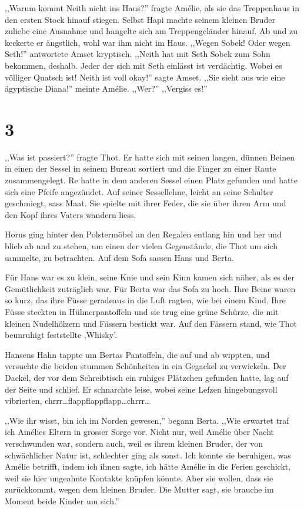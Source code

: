 \documentclass[11pt,titlepage,a5paper]{book}
\begin{document}
,,Warum kommt Neith nicht ins Haus?'' fragte Amélie, als sie das Treppenhaus in den ersten Stock hinauf stiegen. Selbst Hapi machte seinem kleinen Bruder zuliebe eine Ausnahme und hangelte sich am Treppengeländer hinauf. Ab und zu keckerte er ängstlich, wohl war ihm nicht im Haus. ,,Wegen Sobek! Oder wegen Seth!'' antwortete Amset kryptisch. ,,Neith hat mit Seth Sobek zum Sohn bekommen, deshalb. Jeder der sich mit Seth einlässt ist verdächtig. Wobei es völliger Quatsch ist! Neith ist voll okay!'' sagte Amset. ,,Sie sieht aus wie eine ägyptische Diana!'' meinte Amélie. ,,Wer?'' ,,Vergiss es!''

\section*{3}

,,Was ist passiert?'' fragte Thot. Er hatte sich mit seinen langen, dünnen Beinen in einen der Sessel in seinem Bureau sortiert und die Finger zu einer Raute zusammengelegt. Re hatte in dem anderen Sessel einen Platz gefunden und hatte sich eine Pfeife angezündet. Auf seiner Sessellehne, leicht an seine Schulter geschmiegt, sass Maat. Sie spielte mit ihrer Feder, die sie über ihren Arm und den Kopf ihres Vaters wandern liess. 

Horus ging hinter den Polstermöbel an den Regalen entlang hin und her und blieb ab und zu stehen, um einen der vielen Gegenstände, die Thot um sich sammelte, zu betrachten. Auf dem Sofa sassen Hans und Berta.

Für Hans war es zu klein, seine Knie und sein Kinn kamen sich näher, als es der Gemütlichkeit zuträglich war. Für Berta war das Sofa zu hoch. Ihre Beine waren so kurz, das ihre Füsse geradeaus in die Luft ragten, wie bei einem Kind. Ihre Füsse steckten in  Hühnerpantoffeln und sie trug eine grüne Schürze, die mit kleinen Nudelhölzern und Fässern bestickt war. Auf den Fässern stand, wie Thot beunruhigt feststellte ,Whisky'.

 Hansens Hahn tappte um Bertas Pantoffeln, die auf und ab wippten, und versuchte die beiden stummen Schönheiten in ein Gegackel zu verwickeln. Der Dackel, der vor dem Schreibtisch ein ruhiges Plätzchen gefunden hatte, lag auf der Seite und schlief. Er schnarchte leise, wobei seine Lefzen hingebungsvoll vibrierten, chrrr\dots flappflappflapp\dots chrrr\dots
 
,,Wie ihr wisst, bin ich im Norden gewesen,'' begann Berta. ,,Wie erwartet traf ich Amélies Eltern in grosser Sorge vor. Nicht nur, weil Amélie über Nacht verschwunden war, sondern auch, weil es ihrem kleinen Bruder, der von schwächlicher Natur ist, schlechter ging als sonst. Ich konnte sie beruhigen, was Amélie betrifft, indem ich ihnen sagte, ich hätte Amélie in die Ferien geschickt, weil sie hier ungeahnte Kontakte knüpfen könnte. Aber sie wollen, dass sie zurückkommt, wegen dem kleinen Bruder.  Die Mutter sagt, sie brauche im Moment beide Kinder um sich.'' 
\end{document}
